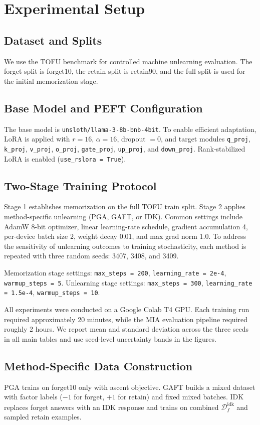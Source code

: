 \documentclass[conference]{IEEEtran}
\begin{document}
\section{Experimental Setup}
\subsection{Dataset and Splits}
We use the TOFU benchmark for controlled machine unlearning evaluation. The forget split is forget10, the retain split is retain90, and the full split is used for the initial memorization stage.

\subsection{Base Model and PEFT Configuration}
The base model is \texttt{unsloth/llama-3-8b-bnb-4bit}. To enable efficient adaptation, LoRA is applied with $r = 16$, $\alpha = 16$, dropout $= 0$, and target modules \texttt{q\_proj}, \texttt{k\_proj}, \texttt{v\_proj}, \texttt{o\_proj}, \texttt{gate\_proj}, \texttt{up\_proj}, and \texttt{down\_proj}. Rank-stabilized LoRA is enabled (\texttt{use\_rslora = True}).

\subsection{Two-Stage Training Protocol}
Stage 1 establishes memorization on the full TOFU train split. Stage 2 applies method-specific unlearning (PGA, GAFT, or IDK). Common settings include AdamW 8-bit optimizer, linear learning-rate schedule, gradient accumulation 4, per-device batch size 2, weight decay 0.01, and max grad norm 1.0. To address the sensitivity of unlearning outcomes to training stochasticity, each method is repeated with three random seeds: 3407, 3408, and 3409.

Memorization stage settings: \texttt{max\_steps = 200}, \texttt{learning\_rate = 2e-4}, \texttt{warmup\_steps = 5}. Unlearning stage settings: \texttt{max\_steps = 300}, \texttt{learning\_rate = 1.5e-4}, \texttt{warmup\_steps = 10}.

All experiments were conducted on a Google Colab T4 GPU. Each training run required approximately 20 minutes, while the MIA evaluation pipeline required roughly 2 hours. We report mean and standard deviation across the three seeds in all main tables and use seed-level uncertainty bands in the figures.

\subsection{Method-Specific Data Construction}
PGA trains on forget10 only with ascent objective. GAFT builds a mixed dataset with factor labels ($-1$ for forget, $+1$ for retain) and fixed mixed batches. IDK replaces forget answers with an IDK response and trains on combined $\mathcal{D}_f^{\mathrm{idk}}$ and sampled retain examples.
\end{document}
